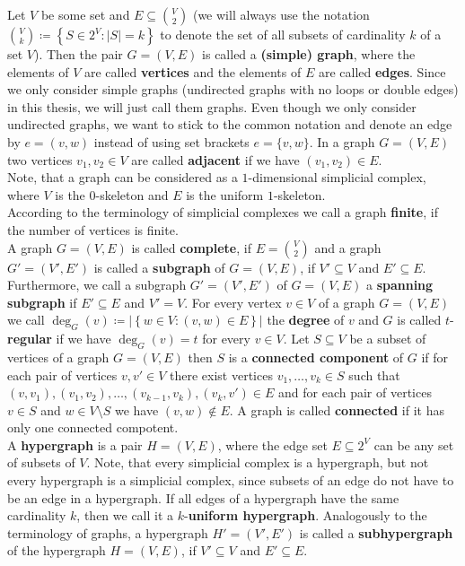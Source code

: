 Let \(V\) be some set and \(E\subseteq\binom{V}{2}\) (we will always use the notation\\
\(\binom{V}{k}\coloneqq \left\{S\in 2^V:\left|S\right|=k\right\}\) to denote the set of all subsets of cardinality \(k\) of a set \(V\)). Then the pair \(G=\left(V,E\right)\) is called a \textbf{(simple) graph}, where the elements of \(V\) are called \textbf{vertices} and the elements of \(E\) are called \textbf{edges}. Since we only consider simple graphs (undirected graphs with no loops or double edges) in this thesis, we will just call them graphs. Even though we only consider undirected graphs, we want to stick to the common notation and denote an edge by \(e=(v,w)\) instead of using set brackets \(e=\{v,w\}\). In a graph \(G=(V,E)\) two vertices \(v_1,v_2\in V\) are called \textbf{adjacent} if we have \((v_1,v_2)\in E\).\\
Note, that a graph can be considered as a \(1\)-dimensional simplicial complex, where \(V\) is the \(0\)-skeleton and \(E\) is the uniform \(1\)-skeleton.\\
According to the terminology of simplicial complexes we call a graph \textbf{finite}, if the number of vertices is finite.\\
A graph \(G=(V,E)\) is called \textbf{complete}, if \(E=\binom{V}{2}\) and a graph \(G'=(V',E')\) is called a \textbf{subgraph} of \(G=(V,E)\), if \(V'\subseteq V\) and \(E'\subseteq E\). Furthermore, we call a subgraph \(G'=(V',E')\) of \(G=(V,E)\) a \textbf{spanning subgraph} if \(E'\subseteq E\) and \(V'=V\). For every vertex \(v\in V\) of a graph \(G=(V,E)\) we call \(\deg_G(v)\coloneqq \left|\left\{w\in V:(v,w)\in E\right\}\right|\) the \textbf{degree} of \(v\) and \(G\) is called \(t\)-\textbf{regular} if we have \(\deg_G(v)=t\) for every \(v\in V\). Let \(S\subseteq V\) be a subset of vertices of a graph \(G=(V,E)\) then \(S\) is a \textbf{connected component} of \(G\) if for each pair of vertices \(v,v'\in V\) there exist vertices \(v_1,\ldots,v_k\in S\) such that \((v,v_1),(v_1,v_2),\ldots,(v_{k-1},v_k),(v_k,v')\in E\) and for each pair of vertices \(v\in S\) and \(w\in V\setminus S\) we have \((v,w)\notin E\). A graph is called \textbf{connected} if it has only one connected compotent.\\
A \textbf{hypergraph} is a pair \(H=(V,E)\), where the edge set \(E\subseteq 2^V\) can be any set of subsets of \(V\). Note, that every simplicial complex is a hypergraph, but not every hypergraph is a simplicial complex, since subsets of an edge do not have to be an edge in a hypergraph. If all edges of a hypergraph have the same cardinality \(k\), then we call it a \(k\)-\textbf{uniform hypergraph}. Analogously to the terminology of graphs, a hypergraph \(H'=(V',E')\) is called a \textbf{subhypergraph} of the hypergraph \(H=(V,E)\), if \(V'\subseteq V\) and \(E'\subseteq E\).

